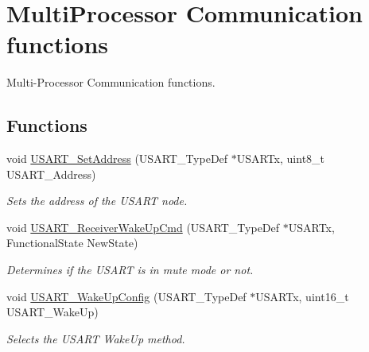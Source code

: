 \hypertarget{group___u_s_a_r_t___group3}{\section{Multi\-Processor Communication functions}
\label{group___u_s_a_r_t___group3}
}


Multi-\/\-Processor Communication functions.  


\subsection*{Functions}
\begin{DoxyCompactItemize}
\item 
void \hyperlink{group___u_s_a_r_t___group3_ga65ec9928817f3f031dd9a4dfc95d6666}{U\-S\-A\-R\-T\-\_\-\-Set\-Address} (U\-S\-A\-R\-T\-\_\-\-Type\-Def $\ast$U\-S\-A\-R\-Tx, uint8\-\_\-t U\-S\-A\-R\-T\-\_\-\-Address)
\begin{DoxyCompactList}\small\item\em Sets the address of the U\-S\-A\-R\-T node. \end{DoxyCompactList}\item 
void \hyperlink{group___u_s_a_r_t___group3_gac27b78ce445a16fe33851d2f87781c02}{U\-S\-A\-R\-T\-\_\-\-Receiver\-Wake\-Up\-Cmd} (U\-S\-A\-R\-T\-\_\-\-Type\-Def $\ast$U\-S\-A\-R\-Tx, Functional\-State New\-State)
\begin{DoxyCompactList}\small\item\em Determines if the U\-S\-A\-R\-T is in mute mode or not. \end{DoxyCompactList}\item 
void \hyperlink{group___u_s_a_r_t___group3_ga4965417c2412c36e462fcad50a8d5393}{U\-S\-A\-R\-T\-\_\-\-Wake\-Up\-Config} (U\-S\-A\-R\-T\-\_\-\-Type\-Def $\ast$U\-S\-A\-R\-Tx, uint16\-\_\-t U\-S\-A\-R\-T\-\_\-\-Wake\-Up)
\begin{DoxyCompactList}\small\item\em Selects the U\-S\-A\-R\-T Wake\-Up method. \end{DoxyCompactList}\end{DoxyCompactItemize}


